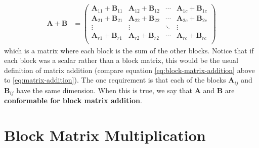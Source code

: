 \documentclass[
]{book}
\theoremstyle{definition}
\theoremstyle{definition}
\theoremstyle{definition}
\theoremstyle{definition}
\theoremstyle{remark}
\begin{document}
\[
\begin{aligned}
\mathbf{A} + \mathbf{B} & =
\begin{pmatrix} \mathbf{A}_{11} + \mathbf{B}_{11} & \mathbf{A}_{12} + \mathbf{B}_{12} & \cdots & \mathbf{A}_{1c} + \mathbf{B}_{1c}\\
\mathbf{A}_{21} + \mathbf{B}_{21} & \mathbf{A}_{22} + \mathbf{B}_{22} & \cdots & \mathbf{A}_{2c} + \mathbf{B}_{2c} \\
\vdots & \vdots & \ddots & \vdots \\
\mathbf{A}_{r1} + \mathbf{B}_{r1} & \mathbf{A}_{r2} + \mathbf{B}_{r2} & \cdots & \mathbf{A}_{rc} + \mathbf{B}_{rc} \\
\end{pmatrix}
\end{aligned}
\label{eq:block-matrix-addition}
\]
which is a matrix where each block is the sum of the other blocks. Notice that if each block was a scalar rather than a block matrix, this would be the usual definition of matrix addition (compare equation \eqref{eq:block-matrix-addition} above to \eqref{eq:matrix-addition}). The one requirement is that each of the blocks \(\mathbf{A}_{ij}\) and \(\mathbf{B}_{ij}\) have the same dimension. When this is true, we say that \(\mathbf{A}\) and \(\mathbf{B}\) are \textbf{conformable for block matrix addition}.

\hypertarget{block-matrix-multiplication}{%
\section{Block Matrix Multiplication}\label{block-matrix-multiplication}}
\end{document}
